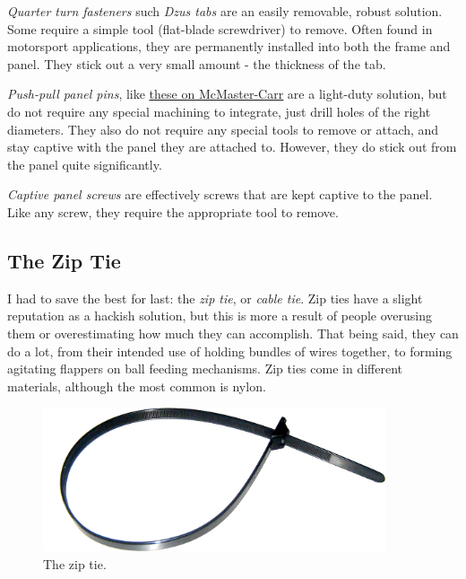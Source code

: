 \documentclass[10pt,letterpaper]{book}
\begin{document}
	\begin{asparaenum}[a)]
		\item \textit{Quarter turn fasteners} such \textit{Dzus tabs} are an easily removable, robust solution. Some require a simple tool (flat-blade screwdriver) to remove. Often found in motorsport applications, they are permanently installed into both the frame and panel. They stick out a very small amount - the thickness of the tab.
		\item \textit{Push-pull panel pins}, like \href{https://www.mcmaster.com/panel-fasteners/screws-and-bolts/push-pull-captive-panel-screws/}{\color{red}\underline{these on McMaster-Carr}} are a light-duty solution, but do not require any special machining to integrate, just drill holes of the right diameters. They also do not require any special tools to remove or attach, and stay captive with the panel they are attached to. However, they do stick out from the panel quite significantly.
		\item \textit{Captive panel screws} are effectively screws that are kept captive to the panel. Like any screw, they require the appropriate tool to remove.
	\end{asparaenum}
	
	\subsection{The Zip Tie}
	I had to save the best for last: the \textit{zip tie}, or \textit{cable tie}. Zip ties have a slight reputation as a hackish solution, but this is more a result of people overusing them or overestimating how much they can accomplish. That being said, they can do a lot, from their intended use of holding bundles of wires together, to forming agitating flappers on ball feeding mechanisms. Zip ties come in different materials, although the most common is nylon.
	
	\begin{figure}[H]
		\includegraphics[width=0.9\textwidth]{imgs/ziptie.png}
		\caption{The zip tie.}
	\end{figure}
	
\end{document}

